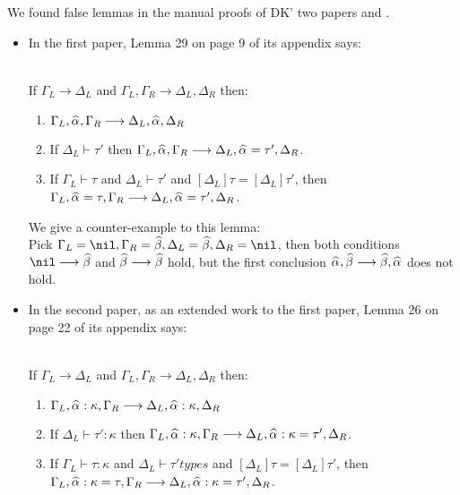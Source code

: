 We found false lemmas in the manual proofs of DK' two papers
\cite{dunfield2013complete} and \cite{DunfieldIndexed}.
\begin{itemize}
    \item
        In the first paper, Lemma 29 on page 9 of its appendix says:
        \begin{lemma}~\\
        If $\Gamma_L \longrightarrow \Delta_L$ and
        $\Gamma_L, \Gamma_R \longrightarrow \Delta_L, \Delta_R$ then:
        \begin{enumerate}
            \item $\Gamma_L,\al,\Gamma_R \longrightarrow \Delta_L, \al, \Delta_R$
            \item If $\Delta_L \vdash \tau'$ then
                $\Gamma_L,\al,\Gamma_R \longrightarrow \Delta_L, \al = \tau', \Delta_R$.
            \item If $\Gamma_L \vdash \tau$ and $\Delta_L \vdash \tau'$ and
                $[\Delta_L]\tau = [\Delta_L]\tau'$, then
                $\Gamma_L, \al = \tau, \Gamma_R \longrightarrow \Delta_L, \al = \tau', \Delta_R$.
        \end{enumerate}
        \end{lemma}

        We give a counter-example to this lemma:\\
        Pick $\Gm_L = \nil, \Gm_R = \bt, \Delta_L = \bt, \Delta_R = \nil$, then both conditions
        $\nil\longrightarrow \bt$ and $\bt\longrightarrow \bt$ hold, but the first conclusion
        $\al,\bt \longrightarrow \bt,\al$ does not hold.
    \item
        In the second paper, as an extended work to the first paper, Lemma 26 on page 22 of its appendix says:
        \begin{lemma}~\\
        If $\Gamma_L \longrightarrow \Delta_L$ and
        $\Gamma_L, \Gamma_R \longrightarrow \Delta_L, \Delta_R$ then:
        \begin{enumerate}
            \item $\Gamma_L,\al:\kappa,\Gamma_R \longrightarrow \Delta_L, \al:\kappa, \Delta_R$
            \item If $\Delta_L \vdash \tau' : \kappa$ then
                $\Gamma_L,\al:\kappa,\Gamma_R \longrightarrow \Delta_L, \al:\kappa = \tau', \Delta_R$.
            \item If $\Gamma_L \vdash \tau : \kappa$ and $\Delta_L \vdash \tau' types$ and
                $[\Delta_L]\tau = [\Delta_L]\tau'$, then
                $\Gamma_L, \al:\kappa = \tau, \Gamma_R \longrightarrow \Delta_L, \al:\kappa = \tau', \Delta_R$.
        \end{enumerate}
        \end{lemma}
        

\end{itemize}
